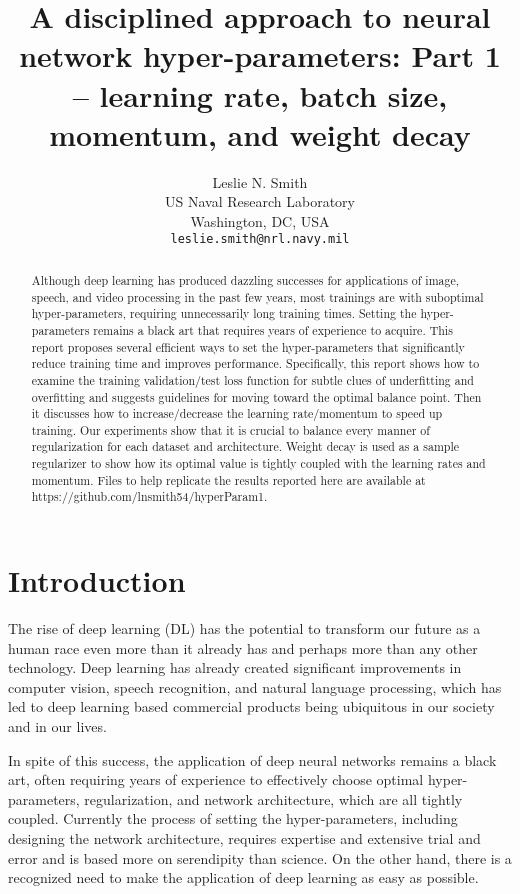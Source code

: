 \documentclass{article} %
\title{A disciplined approach to neural network hyper-parameters: Part 1 -- learning rate, batch size, momentum, and weight decay}
\author{Leslie N. Smith \\
US Naval Research Laboratory\\
Washington, DC, USA \\
\texttt{leslie.smith@nrl.navy.mil} \\
}
\begin{document}
\maketitle


\begin{abstract}
Although deep learning has produced dazzling successes for applications of image, speech, and video processing in the past few years, most trainings are with suboptimal hyper-parameters, requiring unnecessarily long training times.  Setting the hyper-parameters remains a black art that requires years of experience to acquire.  This report proposes several efficient ways to set the hyper-parameters that significantly reduce training time and improves performance.  Specifically, this report shows how to examine the  training validation/test loss function for subtle clues of underfitting and overfitting and suggests guidelines for moving toward the optimal balance point.  Then it discusses how to increase/decrease the learning rate/momentum to speed up training.  Our experiments show that it is crucial to balance every manner of regularization for each dataset and architecture.  Weight decay is used as a sample regularizer to show how its optimal value is tightly coupled with the learning rates and momentum. Files to help replicate the results reported here are available at https://github.com/lnsmith54/hyperParam1.
\end{abstract}

\section{Introduction}
\label{sec:introduction}

The rise of deep learning (DL) has the potential to transform our future as a human race even more than it already has and perhaps more than any other technology.    Deep learning has already created significant improvements in computer vision, speech recognition, and natural language processing, which has led to deep learning based commercial products being ubiquitous in our society and in our lives.  

In spite of this success, the application of deep neural networks remains a black art, often requiring years of experience to effectively choose optimal hyper-parameters, regularization, and network architecture, which are all tightly coupled. Currently the process of setting the hyper-parameters, including designing the network architecture, requires expertise and extensive trial and error and is based more on serendipity than science. On the other hand, there is a recognized need to make the application of deep learning as easy as possible.  
\end{document}
